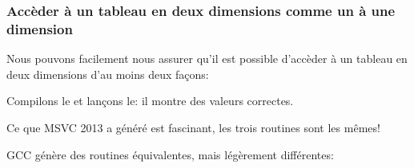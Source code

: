 ﻿\subsubsection{Accèder à un tableau en deux dimensions comme un à une dimension}

Nous pouvons facilement nous assurer qu'il est possible d'accèder à un tableau en
deux dimensions d'au moins deux façons:



Compilons le et lançons le: il montre des valeurs correctes.

Ce que MSVC 2013 a généré est fascinant, les trois routines sont les mêmes!



GCC génère des routines équivalentes, mais légèrement différentes:



